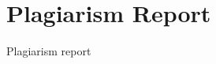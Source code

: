 \documentclass[oneside,a4paper,12pt]{report}
\begin{document}
\begin{appendices}
\begin{enumerate}
\end{enumerate}

\chapter{Plagiarism Report}
Plagiarism report


\end{appendices}
\end{document}
